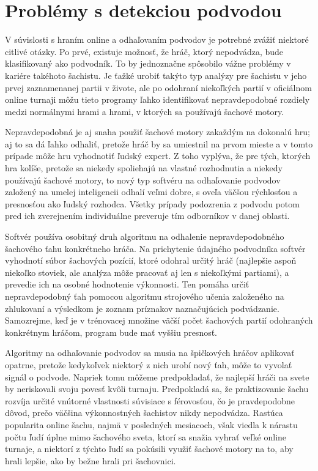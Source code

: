 \documentclass[10pt,oneside,slovak,a4paper]{article}
\begin{document}
\section{Problémy s detekciou podvodou }

V súvislosti s hraním online a odhaľovaním podvodov je potrebné zvážiť niektoré citlivé otázky. Po prvé, existuje možnosť, že hráč, ktorý nepodvádza, bude klasifikovaný ako podvodník. To by jednoznačne spôsobilo vážne problémy v kariére takéhoto šachistu. Je ťažké urobiť takýto typ analýzy pre šachistu v jeho prvej zaznamenanej partii v živote, ale po odohraní niekoľkých partií v oficiálnom online turnaji môžu tieto programy ľahko identifikovať nepravdepodobné rozdiely medzi normálnymi hrami a hrami, v ktorých sa používajú šachové motory.

Nepravdepodobná je aj snaha použiť šachové motory zakaždým na dokonalú hru; aj to sa dá ľahko odhaliť, pretože hráč by sa umiestnil na prvom mieste a v tomto prípade môže hru vyhodnotiť ľudský expert. Z toho vyplýva, že pre tých, ktorých hra kolíše, pretože sa niekedy spoliehajú na vlastné rozhodnutia a niekedy používajú šachové motory, to nový typ softvéru na odhaľovanie podvodov založený na umelej inteligencii odhalí veľmi dobre, s oveľa väčšou rýchlosťou a presnosťou ako ľudský rozhodca. Všetky prípady podozrenia z podvodu potom pred ich zverejnením individuálne preveruje tím odborníkov v danej oblasti.

Softvér používa osobitný druh algoritmu na odhalenie nepravdepodobného šachového ťahu konkrétneho hráča. Na prichytenie údajného podvodníka softvér vyhodnotí súbor šachových pozícií, ktoré odohral určitý hráč (najlepšie aspoň niekoľko stoviek, ale analýza môže pracovať aj len s niekoľkými partiami), a prevedie ich na osobné hodnotenie výkonnosti. Ten pomáha určiť nepravdepodobný ťah pomocou algoritmu strojového učenia založeného na zhlukovaní a výsledkom je zoznam príznakov naznačujúcich podvádzanie. Samozrejme, keď je v trénovacej množine väčší počet šachových partií odohraných konkrétnym hráčom, program bude mať vyššiu presnosť.

Algoritmy na odhaľovanie podvodov sa musia na špičkových hráčov aplikovať opatrne, pretože kedykoľvek niektorý z nich urobí nový ťah, môže to vyvolať signál o podvode. Napriek tomu môžeme predpokladať, že najlepší hráči na svete by neriskovali svoju povesť kvôli turnaju. Predpokladá sa, že praktizovanie šachu rozvíja určité vnútorné vlastnosti súvisiace s férovosťou, čo je pravdepodobne dôvod, prečo väčšina výkonnostných šachistov nikdy nepodvádza. Rastúca popularita online šachu, najmä v posledných mesiacoch, však viedla k nárastu počtu ľudí úplne mimo šachového sveta, ktorí sa snažia vyhrať veľké online turnaje, a niektorí z týchto ľudí sa pokúsili využiť šachové motory na to, aby hrali lepšie, ako by bežne hrali pri šachovnici.
\end{document}
